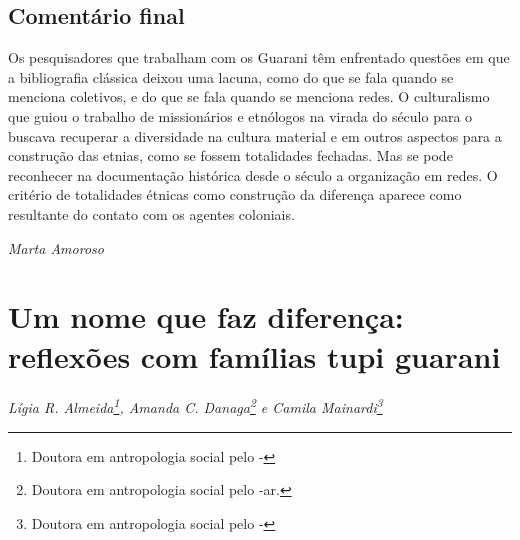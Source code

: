 \section{Comentário final}
Os pesquisadores que trabalham com os Guarani têm enfrentado questões em
que a bibliografia clássica deixou uma lacuna, como do que se fala
quando se menciona coletivos, e do que se fala quando se menciona
redes. O culturalismo que guiou o trabalho de missionários e etnólogos
na virada do século  para o  buscava recuperar a diversidade na
cultura material e em outros aspectos para a construção das etnias,
como se fossem totalidades fechadas. Mas se pode reconhecer na
documentação histórica desde o século  a organização em redes. O
critério de totalidades étnicas como construção da diferença aparece
como resultante do contato com os agentes coloniais.
\medskip
\begin{flushright}
\emph{Marta Amoroso}
\end{flushright}

\chapter{Um nome que faz diferença: reflexões com famílias tupi guarani}
\begin{flushright}
\emph{Lígia R. Almeida\footnote{Doutora em antropologia social pelo
-}, Amanda C. Danaga\footnote{Doutora em antropologia
social pelo -ar.} e Camila Mainardi\footnote{Doutora em antropologia social pelo -}}
\end{flushright}
\medskip
%

